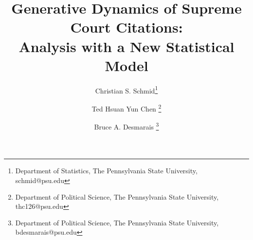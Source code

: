 \documentclass[headsepline=true, abstracton]{scrartcl}
\begin{document}
\renewcommand{\refname}{Bibliography}


\onehalfspacing
\setlength{\headsep}{15mm}


\thispagestyle{plain}

\title{\Large Generative Dynamics of Supreme Court Citations: \\ Analysis with a New Statistical Model}

\author{%
  Christian S. Schmid\footnote{Department of Statistics, The Pennsylvania State University, schmid@psu.edu}%
  \and Ted Hsuan Yun Chen \footnote{Department of Political Science, The Pennsylvania State University, thc126@psu.edu}%
  \and Bruce A. Desmarais \footnote{Department of Political Science, The Pennsylvania State University, bdesmarais@psu.edu}%
  }
\end{document}
